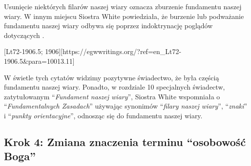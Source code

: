 Usunięcie niektórych filarów naszej wiary oznacza zburzenie fundamentu naszej wiary. W innym miejscu Siostra White powiedziała, że burzenie lub podważanie fundamentu naszej wiary odbywa się poprzez indoktrynację poglądów dotyczących .

[Lt72-1906.5; 1906][https://egwwritings.org/?ref=en\_Lt72-1906.5&para=10013.11]

W świetle tych cytatów widzimy pozytywne świadectwo, że  była częścią fundamentu naszej wiary. Ponadto, w rozdziale 10 specjalnych świadectw, zatytułowanym “\textit{Fundament naszej wiary}”, Siostra White wspomniała o “\textit{Fundamentalnych Zasadach}” używając synonimów “\textit{filary naszej wiary}”, “\textit{znaki}” i “\textit{punkty orientacyjne}”, odnosząc się do fundamentu naszej wiary.

\subsection*{Krok 4: Zmiana znaczenia terminu “osobowość Boga”}

